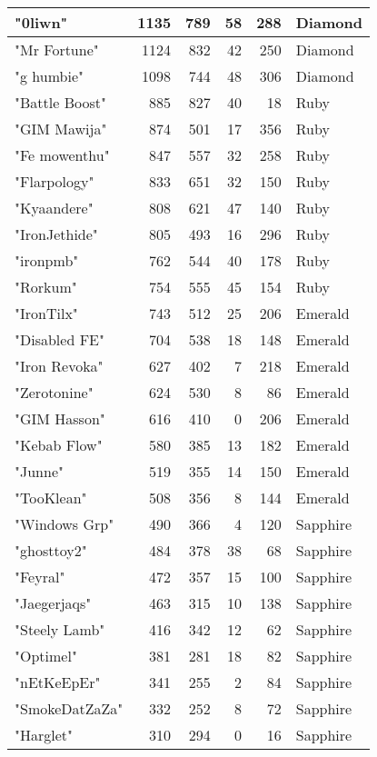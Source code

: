 \documentclass{article}
\begin{document}
\begin{table}[htbp]
\begin{tabular}{|l|r|r|r|r|l|}
"0liwn" & 1135 & 789 & 58 & 288 & Diamond \\ \hline
"Mr Fortune" & 1124 & 832 & 42 & 250 & Diamond \\ \hline
"g humbie" & 1098 & 744 & 48 & 306 & Diamond \\ \hline
"Battle Boost" & 885 & 827 & 40 & 18 & Ruby \\ \hline
"GIM Mawija" & 874 & 501 & 17 & 356 & Ruby \\ \hline
"Fe mowenthu" & 847 & 557 & 32 & 258 & Ruby \\ \hline
"Flarpology" & 833 & 651 & 32 & 150 & Ruby \\ \hline
"Kyaandere" & 808 & 621 & 47 & 140 & Ruby \\ \hline
"IronJethide" & 805 & 493 & 16 & 296 & Ruby \\ \hline
"ironpmb" & 762 & 544 & 40 & 178 & Ruby \\ \hline
"Rorkum" & 754 & 555 & 45 & 154 & Ruby \\ \hline
"IronTilx" & 743 & 512 & 25 & 206 & Emerald \\ \hline
"Disabled FE" & 704 & 538 & 18 & 148 & Emerald \\ \hline
"Iron Revoka" & 627 & 402 & 7 & 218 & Emerald \\ \hline
"Zerotonine" & 624 & 530 & 8 & 86 & Emerald \\ \hline
"GIM Hasson" & 616 & 410 & 0 & 206 & Emerald \\ \hline
"Kebab Flow" & 580 & 385 & 13 & 182 & Emerald \\ \hline
"Junne" & 519 & 355 & 14 & 150 & Emerald \\ \hline
"TooKlean" & 508 & 356 & 8 & 144 & Emerald \\ \hline
"Windows Grp" & 490 & 366 & 4 & 120 & Sapphire \\ \hline
"ghosttoy2" & 484 & 378 & 38 & 68 & Sapphire \\ \hline
"Feyral" & 472 & 357 & 15 & 100 & Sapphire \\ \hline
"Jaegerjaqs" & 463 & 315 & 10 & 138 & Sapphire \\ \hline
"Steely Lamb" & 416 & 342 & 12 & 62 & Sapphire \\ \hline
"Optimel" & 381 & 281 & 18 & 82 & Sapphire \\ \hline
"nEtKeEpEr" & 341 & 255 & 2 & 84 & Sapphire \\ \hline
"SmokeDatZaZa" & 332 & 252 & 8 & 72 & Sapphire \\ \hline
"Harglet" & 310 & 294 & 0 & 16 & Sapphire \\ \hline

\end{tabular}
\end{table}
\end{document}
